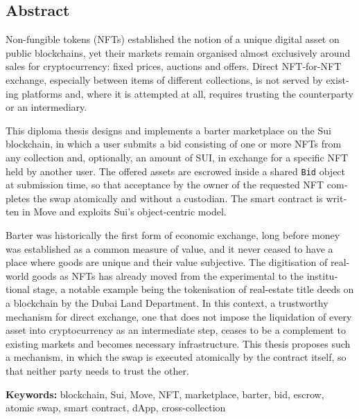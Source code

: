 \begin{english}
\chapter*{Abstract}
Non-fungible tokens (NFTs) established the notion of a unique digital asset on public
blockchains, yet their markets remain organised almost exclusively around sales for
cryptocurrency: fixed prices, auctions and offers. Direct NFT-for-NFT exchange, especially
between items of different collections, is not served by existing platforms and, where it is
attempted at all, requires trusting the counterparty or an intermediary.

This diploma thesis designs and implements a barter marketplace on the Sui blockchain, in
which a user submits a bid consisting of one or more NFTs from any collection and,
optionally, an amount of SUI, in exchange for a specific NFT held by another user. The
offered assets are escrowed inside a shared \texttt{Bid} object at submission time, so that
acceptance by the owner of the requested NFT completes the swap atomically and without a
custodian. The smart contract is written in Move and exploits Sui's object-centric model.

Barter was historically the first form of economic exchange, long before money was
established as a common measure of value, and it never ceased to have a place where goods
are unique and their value subjective. The digitisation of real-world goods as NFTs has
already moved from the experimental to the institutional stage, a notable example being the
tokenisation of real-estate title deeds on a blockchain by the Dubai Land Department. In this context, a trustworthy
mechanism for direct exchange, one that does not impose the liquidation of every asset into
cryptocurrency as an intermediate step, ceases to be a complement to existing markets and
becomes necessary infrastructure. This thesis proposes such a mechanism, in which the swap is
executed atomically by the contract itself, so that neither party needs to trust the other.

\vspace{1cm}
\noindent\textbf{Keywords:} blockchain, Sui, Move, NFT, marketplace, barter, bid, escrow,
atomic swap, smart contract, dApp, cross-collection
\end{english}
\clearpage
